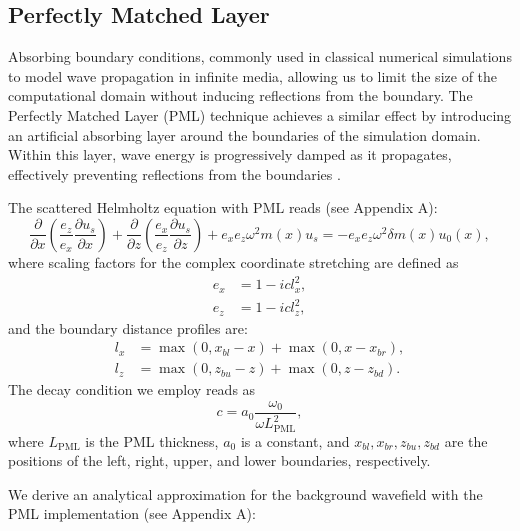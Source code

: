 \documentclass[authoryear, preprint, 12pt]{elsarticle}
\begin{document}
\subsection{Perfectly Matched Layer}  
Absorbing boundary conditions, commonly used in classical numerical simulations to model wave propagation in infinite media, allowing us to limit the size of the computational domain without inducing reflections from the boundary. The Perfectly Matched Layer (PML) technique achieves a similar effect by introducing an artificial absorbing layer around the boundaries of the simulation domain. Within this layer, wave energy is progressively damped as it propagates, effectively preventing reflections from the boundaries \citep{berenger1994perfectly}.  

The scattered Helmholtz equation with PML reads (see Appendix A):  
\begin{equation}
	\frac{\partial}{\partial x} \left( \frac{e_z}{e_x} \frac{\partial u_s}{\partial x} \right) +
	\frac{\partial}{\partial z} \left( \frac{e_x}{e_z} \frac{\partial u_s}{\partial z} \right) +
	e_x e_z \omega^2 m(x) u_s = - e_x e_z \omega^2 \delta m(x) u_0(x),
	\label{eq:scattered_helmholtz_PML}
\end{equation}
where scaling factors for the complex coordinate stretching are defined as  
\begin{equation}
	\begin{aligned}
		e_x &= 1 - i c l_x^2, \\
		e_z &= 1 - i c l_z^2,
	\end{aligned}
	\label{eq:ex_ez}
\end{equation}
and the boundary distance profiles are: 
\begin{equation}
	\begin{aligned}
		l_x &= \max(0, x_{bl} - x) + \max(0, x - x_{br}), \\
		l_z &= \max(0, z_{bu} - z) + \max(0, z - z_{bd}). 
	\end{aligned}
	\label{eq:lx_lz}
\end{equation}
The decay condition we employ reads as  
\begin{equation}
	c = a_0 \frac{\omega_0}{\omega L_{\text{PML}}^2},
	\label{eq:c}
\end{equation}
where \( L_{\text{PML}} \) is the PML thickness, \( a_0 \) is a constant, and \( x_{bl}, x_{br}, z_{bu}, z_{bd} \) are the positions of the left, right, upper, and lower boundaries, respectively.  

We derive an analytical approximation for the background wavefield with the PML implementation (see Appendix A):  
\end{document}
